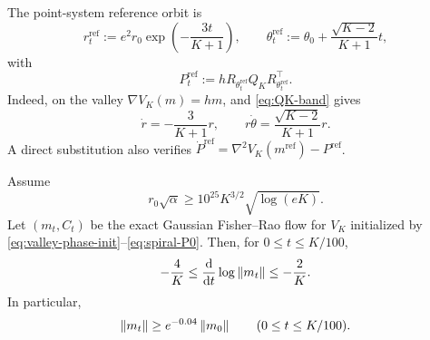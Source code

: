 The point-system reference orbit is
\begin{equation}
\label{eq:reference-orbit}
    r_t^{\mathrm{ref}}
    :=e^2r_0\exp\left(-\frac{3t}{K+1}\right),
    \qquad
    \theta_t^{\mathrm{ref}}
    :=\theta_0+\frac{\sqrt{K-2}}{K+1}t,
\end{equation}
with
\[
    P_t^{\mathrm{ref}}
    :=hR_{\theta_t^{\mathrm{ref}}}Q_KR_{\theta_t^{\mathrm{ref}}}^\top.
\]
Indeed, on the valley $\nabla V_K(m)=hm$, and \eqref{eq:QK-band} gives
\[
    \dot r=-\frac3{K+1}r,
    \qquad
    r\dot\theta=\frac{\sqrt{K-2}}{K+1}r.
\]
A direct substitution also verifies
$\dot P^{\mathrm{ref}}=\nabla^2V_K(m^{\mathrm{ref}})-P^{\mathrm{ref}}$.

\begin{lemma}
\label{lem:spiral-shadowing}
Assume
\begin{equation}
\label{eq:r0-shadowing}
    r_0\sqrt\alpha
    \geq
    10^{25}K^{3/2}\sqrt{\log(eK)}.
\end{equation}
Let $(m_t,C_t)$ be the exact Gaussian Fisher--Rao flow for $V_K$ initialized by
\eqref{eq:valley-phase-init}--\eqref{eq:spiral-P0}.  Then, for
$0\leq t\leq K/100$,
\begin{equation}
\label{eq:radial-shadowing}
    -\frac4K
    \leq
    \frac{\mathrm{d}}{\mathrm{d} t}\log\left\lVert m_t\right\rVert
    \leq
    -\frac2K.
\end{equation}
In particular,
\begin{equation}
\label{eq:mean-lower-shadowing}
    \left\lVert m_t\right\rVert\geq e^{-0.04}\left\lVert m_0\right\rVert
    \qquad(0\leq t\leq K/100).
\end{equation}
\end{lemma}

